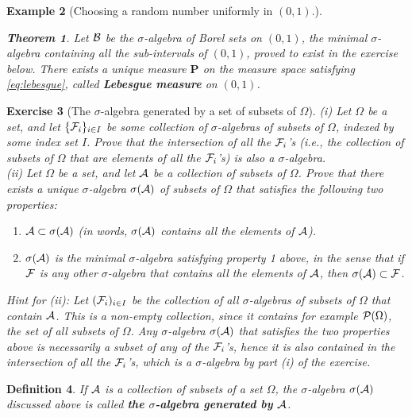 \documentclass[12pt]{article}
\newtheorem{thm}{Theorem}[section]
\newtheorem{defi}[thm]{Definition}
\newtheorem{exercise}[thm]{Exercise}
\newcommand{\prob}{\mathbf{P}}
\theoremstyle{example}
\newtheorem{example}[thm]{Example}
\begin{document}
\begin{example}[Choosing a random number uniformly in $(0,1)$.]
\begin{thm}
Let ${\cal B}$ be the $\sigma$-algebra of Borel sets on $(0,1)$, the minimal $\sigma$-algebra containing all the sub-intervals of $(0,1)$, proved to exist in the exercise below. There exists a unique measure $\prob$ on the measure space satisfying \eqref{eq:lebesgue}, called \textbf{Lebesgue measure} on $(0,1)$.
\label{thm-lebesgue}
\end{thm}
\end{example}

\begin{exercise}[The $\sigma$-algebra generated by a set of subsets of $\Omega$]
(i) Let $\Omega$ be a set, and let $\{{\cal F}_i\}_{i\in I}$ be some collection of $\sigma$-algebras of subsets of $\Omega$, indexed by some index set $I$. Prove that the intersection of all the ${\cal F}_i$'s (i.e., the collection of subsets of $\Omega$ that are elements of all the ${\cal F}_i$'s) is also a $\sigma$-algebra. \\
(ii) Let $\Omega$ be a set, and let ${\cal A}$ be a collection of subsets of $\Omega$. Prove that there exists a unique $\sigma$-algebra $\sigma({\cal A})$ of subsets of $\Omega$ that satisfies the following two properties:
\begin{enumerate}
\item ${\cal A} \subset \sigma({\cal A})$ (in words, $\sigma({\cal A})$ contains all the elements of ${\cal A}$).
\item $\sigma({\cal A})$ is the minimal $\sigma$-algebra satisfying property 1 above, in the sense that if ${\cal F}$ is any other $\sigma$-algebra that contains all the elements of ${\cal A}$, then $\sigma({\cal A}) \subset {\cal F}$.
\end{enumerate}
Hint for (ii): Let $({\cal F}_i)_{i\in I}$ be the collection of all $\sigma$-algebras of subsets of $\Omega$ that contain ${\cal A}$. This is a non-empty collection, since it contains for example ${\cal P}(\Omega)$, the set of all subsets of $\Omega$. Any $\sigma$-algebra $\sigma({\cal A})$ that satisfies the two properties above is necessarily a subset of any of the ${\cal F}_i$'s, hence it is also contained in the intersection of all the ${\cal F}_i$'s, which is a $\sigma$-algebra by part (i) of the exercise.
\end{exercise}

\begin{defi} If ${\cal A}$ is a collection of subsets of a set $\Omega$, the $\sigma$-algebra $\sigma({\cal A})$ discussed above is called \textbf{the $\sigma$-algebra generated by ${\cal A}$}.
\end{defi}
\end{document}
